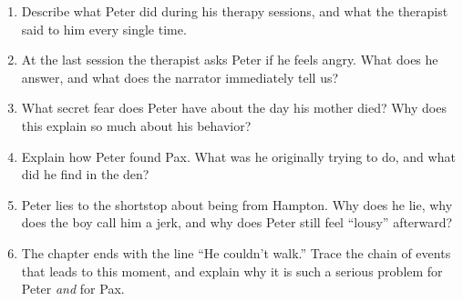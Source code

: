 \documentclass[11pt]{article}
\begin{document}
\begin{enumerate}
  \vspace{0.9in}
  \item Describe what Peter did during his therapy sessions, and what the therapist said to him every single time.
  \vspace{0.9in}
  \item At the last session the therapist asks Peter if he feels angry. What does he answer, and what does the narrator immediately tell us?
  \vspace{8pt}
  \item What secret fear does Peter have about the day his mother died? Why does this explain so much about his behavior?
  \vspace{0.9in}
  \item Explain how Peter found Pax. What was he originally trying to do, and what did he find in the den?
  \vspace{0.9in}
  \item Peter lies to the shortstop about being from Hampton. Why does he lie, why does the boy call him a jerk, and why does Peter still feel ``lousy'' afterward?
  \vspace{0.9in}
  \item The chapter ends with the line ``He couldn't walk.'' Trace the chain of events that leads to this moment, and explain why it is such a serious problem for Peter \textit{and} for Pax.
  \vspace{1.1in}
\end{enumerate}

\newpage
\end{document}
